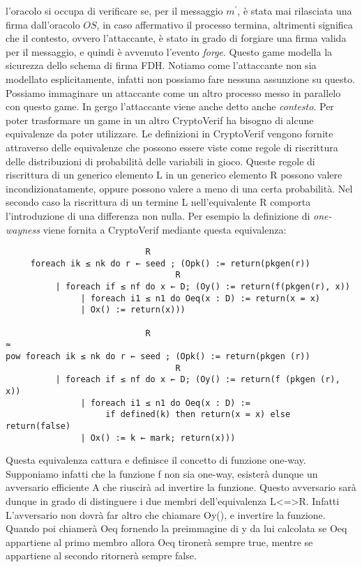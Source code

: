 \documentclass[a4paper,openright,twoside,12pt]{report}
\begin{document}
l'oracolo si occupa di verificare se, per il messaggio $m^{'}$, \`e stata mai rilasciata una firma dall'oracolo $OS$, in caso affermativo il processo termina, altrimenti significa che 
il contesto, ovvero l'attaccante, \`e stato in grado di forgiare una firma valida per il messaggio, e quindi \`e avvenuto l'evento \emph{forge}.
Questo game modella la sicurezza dello schema di firma FDH. Notiamo come l'attaccante non sia modellato esplicitamente, infatti non possiamo fare nessuna assunzione su questo.
Possiamo immaginare un attaccante come un altro processo messo in parallelo con questo game. In gergo l'attaccante viene anche detto anche \emph{contesto}.
Per poter trasformare un game in un altro CryptoVerif ha bisogno di alcune equivalenze da poter utilizzare.
Le definizioni in CryptoVerif vengono fornite attraverso delle equivalenze che possono essere viste come regole di riscrittura delle distribuzioni di probabilit\`a delle variabili in
gioco.
Queste regole di riscrittura di un generico elemento L in un generico elemento R possono valere incondizionatamente, oppure possono valere a meno di una certa probabilit\`a.
Nel secondo caso la riscrittura di un termine L nell'equivalente R comporta l'introduzione di una differenza non nulla.
Per esempio la definizione di \emph{one-wayness} viene fornita a CryptoVerif mediante questa equivalenza:
\newpage
\begin{center}
\begin{verbatim}
                            R
     foreach ik ≤ nk do r ← seed ; (Opk() := return(pkgen(r))
                                  R
          | foreach if ≤ nf do x ← D; (Oy() := return(f(pkgen(r), x))
               | foreach i1 ≤ n1 do Oeq(x : D) := return(x = x)
               | Ox() := return(x)))
                                                                        
                            R
≈
pow foreach ik ≤ nk do r ← seed ; (Opk() := return(pkgen (r))
                                  R
          | foreach if ≤ nf do x ← D; (Oy() := return(f (pkgen (r), x))
               | foreach i1 ≤ n1 do Oeq(x : D) :=
                    if defined(k) then return(x = x) else return(false)
               | Ox() := k ← mark; return(x)))
\end{verbatim}
\end{center}

Questa equivalenza cattura e definisce il concetto di funzione one-way. Supponiamo infatti che la funzione f non sia one-way, esister\`a dunque un avversario efficiente A che riuscir\`a ad invertire 
la funzione. Questo avversario sar\`a dunque in grado di distinguere i due membri dell'equivalenza L<=>R. Infatti L'avversario non dovr\`a far altro che chiamare Oy(), e invertire la funzione.
Quando poi chiamer\`a Oeq fornendo la preimmagine di y da lui calcolata se Oeq appartiene al primo membro allora Oeq tironer\`a sempre true, mentre se appartiene al secondo ritorner\`a sempre false.
\end{document}
